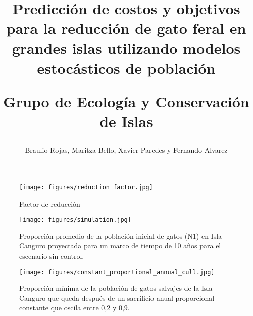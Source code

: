 \documentclass{article} %
\author{Braulio Rojas, Maritza Bello, Xavier Paredes y Fernando Alvarez}
\title{Predicción de costos y objetivos para la reducción de gato feral en grandes islas utilizando modelos estocásticos de población \\ \begin{large} Grupo de Ecología y Conservación de Islas \end{large}}
\begin{document}
\maketitle

\begin{abstract}
\end{abstract}


\begin{figure}[H]
    \centering
\texttt{[image: figures/reduction\_factor.jpg]}
\caption{Factor de reducción}
\label{fig:reductionFactor}
\end{figure}

\begin{figure}[H]
    \centering
\texttt{[image: figures/simulation.jpg]}
\caption{Proporción promedio de la población inicial de gatos (N1) en Isla Canguro proyectada para un marco de tiempo de 10 años para el escenario sin control.}
\label{fig:simulation}
\end{figure}

\begin{figure}[H]
    \centering
\texttt{[image: figures/constant\_proportional\_annual\_cull.jpg]}
\caption{Proporción mínima de la población de gatos salvajes de la Isla Canguro que queda después de un sacrificio anual proporcional constante que oscila entre 0,2 y 0,9.}
\label{fig:constantProportionalAnnualCull}
\end{figure}
\end{document}
